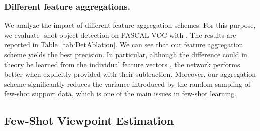 \documentclass[runningheads]{llncs}
\begin{document}
\begin{table}[t]
\addtolength{\tabcolsep}{10pt}
    \centering
    \caption{{\bf Ablation study on the feature aggregation scheme.}
    Using the same class splits of PASCAL VOC as in Table~\ref{tab:DetVOC}, we measure the performance of few-shot object detection on the novel classes. We report the average and standard deviation of the AP50 metric over 10 runs.  is the query features and  is the class features.}
    \vspace{-2mm}
    \label{tab:DetAblation}
\end{table}

\subsubsection{Different feature aggregations.}
We analyze the impact of different feature aggregation schemes. 
For this purpose, we evaluate -shot object detection on PASCAL VOC with . 
The results are reported in Table~\ref{tab:DetAblation}.
We can see that our feature aggregation scheme  yields the best precision. 
In particular, although the difference  could in theory be learned from the individual feature vectors , the network performs better when explicitly provided with their subtraction.
Moreover, our aggregation scheme significantly reduces the variance introduced by the random sampling of few-shot support data, which is one of the main issues in few-shot learning.  



\subsection{Few-Shot Viewpoint Estimation}
\label{sec:ExpView}
\end{document}
